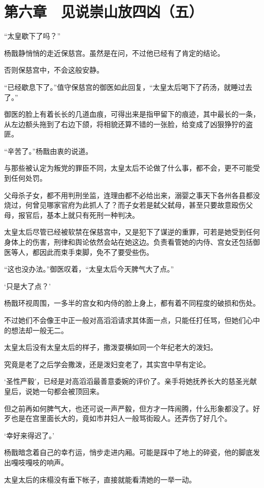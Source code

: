 \section{第六章　见说崇山放四凶（五）}

“太皇歇下了吗？”

杨戬静悄悄的走近保慈宫。虽然是在问，不过他已经有了肯定的结论。

否则保慈宫中，不会这般安静。

“已经歇息下了。”值守保慈宫的御医如此回复，“太皇太后喝下了药汤，就睡过去了。”

御医的脸上有着长长的几道血痕，可得出来是指甲留下的痕迹，其中最长的一条，从左边额头拖到了右边下颌，将相貌还算不错的一张脸，给变成了凶狠狰狞的盗匪。

“辛苦了。”杨戬由衷的说道。

与那些被认定为叛党的罪臣不同，太皇太后不论做了什么事，都不会，更不可能受到任何处罚。

父母杀子女，都不用判刑坐监，连理由都不必给出来，溺婴之事天下各州各县都没烧过，何曾见哪家官府为此抓人了？而子女若是弑父弑母，甚至只要故意殴伤父母，报官后，基本上就只有死刑一种判决。

太皇太后尽管已经被软禁在保慈宫中，又是犯下了谋逆的重罪，可若是她受到任何身体上的伤害，刑律和舆论依然会站在她这边。负责看管她的内侍、宫女还包括御医等人，都因此而束手束脚，免不了要受些伤。

“这也没办法。”御医叹着，“太皇太后今天脾气大了点。”

‘只是大了点？’

杨戬环视周围，一多半的宫女和内侍的脸上身上，都有着不同程度的破损和伤处。

不过她们不会像王中正一般对高滔滔请求其体面一点，只能任打任骂，但她们心中的想法却一般无二。

太皇太后没有太皇太后的样子，撒泼耍横如同一个年纪老大的泼妇。

究竟是老了之后学会撒泼，还是泼妇变老了，其实宫中早有定论。

‘圣性严毅’，已经是对高滔滔最善意委婉的评价了。亲手将她抚养长大的慈圣光献皇后，说她一句都会被顶回来。

但之前再如何脾气大，也还可说一声严毅，但方才一阵闹腾，什么形象都没了。好歹也是在宫里面长大的，竟如市井妇人一般骂街殴人。还弄伤了好几个。

‘幸好来得迟了。’

杨戬暗念着自己的幸冇运，悄步走进内厢。可能是踩中了地上的碎瓷，他的脚底发出嘎吱嘎吱的响声。

太皇太后的床榻没有垂下帐子，直接就能看清她的一举一动。

